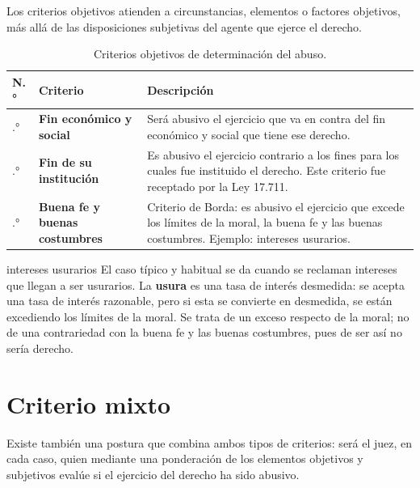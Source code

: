 \documentclass[12pt,oneside]{book}
\begin{document}
Los criterios objetivos atienden a circunstancias, elementos o factores objetivos, más allá de las disposiciones subjetivas del agente que ejerce el derecho.

\begin{table}[H]
\centering
\begin{tabularx}{\textwidth}{
    >{\centering\arraybackslash}p{1cm}
    >{\raggedright\arraybackslash}p{4.2cm}
    >{\raggedright\arraybackslash}X
}
\toprule
\textbf{N.°} & \textbf{Criterio} & \textbf{Descripción} \\
\midrule
1.° & \textbf{Fin económico y social} & Será abusivo el ejercicio que va en contra del fin económico y social que tiene ese derecho. \\
\addlinespace
2.° & \textbf{Fin de su institución} & Es abusivo el ejercicio contrario a los fines para los cuales fue instituido el derecho. Este criterio fue receptado por la Ley 17.711. \\
\addlinespace
3.° & \textbf{Buena fe y buenas costumbres} & Criterio de Borda: es abusivo el ejercicio que excede los límites de la moral, la buena fe y las buenas costumbres. Ejemplo: intereses usurarios. \\
\bottomrule
\end{tabularx}
\caption{Criterios objetivos de determinación del abuso.}
\end{table}

\begin{example}{intereses usurarios}
El caso típico y habitual se da cuando se reclaman intereses que llegan a ser usurarios. La \textbf{usura} es una tasa de interés desmedida: se acepta una tasa de interés razonable, pero si esta se convierte en desmedida, se están excediendo los límites de la moral. Se trata de un exceso respecto de la moral; no de una contrariedad con la buena fe y las buenas costumbres, pues de ser así no sería derecho.
\end{example}

\section{Criterio mixto}

Existe también una postura que combina ambos tipos de criterios: será el juez, en cada caso, quien mediante una ponderación de los elementos objetivos y subjetivos evalúe si el ejercicio del derecho ha sido abusivo.
\end{document}
